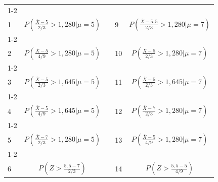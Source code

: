 \begin{questions}
\begin{center}
\begin{tabular}{|l|c|c|l|c|}
	\cline{1-2}\cline{4-5}
	&&&&\\[-3mm]
	 1 &  $\displaystyle P\left( \frac{\overline{X}-5}{ 2 / 3} > 1,280 \bigg| \mu = 5 \right)$
	 & \hspace{0.3cm} &
	 9 &  $\displaystyle P\left( \frac{\overline{X}-5,5}{ 2 / 3} > 1,280 \bigg| \mu = 7 \right)$
	\\[4mm]
	\cline{1-2}\cline{4-5}
	&&&&\\[-3mm]
	 2 & $\displaystyle P\left( \frac{\overline{X} - 5}{4/9} > 1,280 \bigg| \mu = 5  \right)$
	&  &
	 10 & $\displaystyle P\left( \frac{\overline{X}-5}{ 2 / 3} > 1,280 \bigg| \mu = 7 \right)$ 
	\\[4mm]
	\cline{1-2}\cline{4-5}
	&&&&\\[-3mm]
	 3 & $\displaystyle P\left( \frac{\overline{X}-5}{ 2 / 3} > 1,645 \bigg| \mu = 5 \right)$
	 &  &
	  11 & $\displaystyle P\left( \frac{\overline{X}-5}{ 2 / 3} > 1,645 \bigg| \mu = 7 \right)$
	 \\[4mm]
	 \cline{1-2}\cline{4-5}
	 &&&&\\[-3mm]
	   4 & $\displaystyle P\left( \frac{\overline{X} - 5}{4/9} > 1,645 \bigg| \mu = 5  \right)$
	 &  &
	  12 & $\displaystyle P\left( \frac{\overline{X} - 7}{2/3} > 1,280 \bigg| \mu = 7 \right)$
	 \\[4mm]
	 \cline{1-2}\cline{4-5}
	 &&&&\\[-3mm]
	  5 & $\displaystyle P\left( \frac{\overline{X} - 7}{2/3} > 1,280 \bigg| \mu = 5  \right)$
	 &  &
	  13 & $\displaystyle P\left( \frac{\overline{X}-5}{ 4 / 9} > 1,280 \bigg| \mu = 7 \right)$
	 \\[4mm]
	 \cline{1-2}\cline{4-5}
	 &&&&\\[-3mm]
	  6 & $\displaystyle P\left( Z > \frac{5,5-7}{2/3} \right)$
	 &  &
	  14 & $\displaystyle P\left( Z > \frac{5,5-5}{4/9} \right)$

\end{tabular}
\end{center}
\end{questions}
